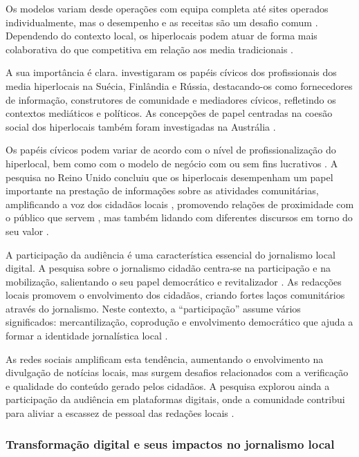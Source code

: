 \documentclass[portuguese]{textolivre}
\begin{document}
Os modelos variam desde operações com equipa completa até sites operados individualmente, mas o desempenho e as receitas são um desafio comum \cite{vankerkhoven2014}. Dependendo do contexto local, os hiperlocais podem atuar de forma mais colaborativa do que competitiva em relação aos media tradicionais \cite{dovbysh2021}.

A sua importância é clara. \textcite{hujanen2021} investigaram os papéis cívicos dos profissionais dos media hiperlocais na Suécia, Finlândia e Rússia, destacando-os como fornecedores de informação, construtores de comunidade e mediadores cívicos, refletindo os contextos mediáticos e políticos. As concepções de papel centradas na coesão social dos hiperlocais também foram investigadas na Austrália \cite{barnes2022}.

Os papéis cívicos podem variar de acordo com o nível de profissionalização do hiperlocal, bem como com o modelo de negócio com ou sem fins lucrativos \cite{tenor2018}. A pesquisa no Reino Unido concluiu que os hiperlocais desempenham um papel importante na prestação de informações sobre as atividades comunitárias, amplificando a voz dos cidadãos locais \cite{williams2015}, promovendo relações de proximidade com o público que servem \cite{harte2017}, mas também lidando com diferentes discursos em torno do seu valor \cite{harte2023}.


A participação da audiência é uma característica essencial do jornalismo local digital. A pesquisa sobre o jornalismo cidadão centra-se na participação e na mobilização, salientando o seu papel democrático e revitalizador \cite{harcap2016, blom2014}. As redacções locais promovem o envolvimento dos cidadãos, criando fortes laços comunitários através do jornalismo. Neste contexto, a “participação” assume vários significados: mercantilização, coprodução e envolvimento democrático que ajuda a formar a identidade jornalística local \cite{carlsson2016}.

As redes sociais amplificam esta tendência, aumentando o envolvimento na divulgação de notícias locais, mas surgem desafios relacionados com a verificação e qualidade do conteúdo gerado pelos cidadãos. A pesquisa explorou ainda a participação da audiência em plataformas digitais, onde a comunidade contribui para aliviar a escassez de pessoal das redações locais \cite{cook2021}.

\subsubsection{Transformação digital e seus impactos no jornalismo local}
\end{document}
